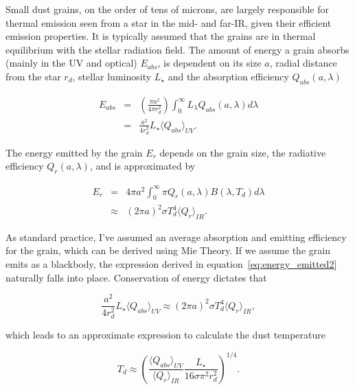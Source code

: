     Small dust grains, on the order of tens of microns, are largely responsible for thermal emission seen from a star in the mid- and far-IR, given their efficient emission properties. It is typically assumed that the grains are in thermal equilibrium with the stellar radiation field. The amount of energy a grain absorbs (mainly in the UV and optical) $E_{abs}$, is dependent on its size $a$, radial distance from the star $r_d$, stellar luminosity $L_\star$ and the absorption efficiency $Q_{abs}(a,\lambda)$
    
    \begin{eqnarray}\label{eq:energy_absorbed}
    E_{abs} &=& \left(\frac{\pi a^2}{4\pi r_d^2}\right) \int_0^\infty L_{\lambda} Q_{abs}(a,\lambda) d\lambda \\
            &=&  \frac{a^2}{4r_d^2}L_\star \langle Q_{abs}\rangle_{UV}. 
    \end{eqnarray}
    
    \noindent The energy emitted by the grain $E_{r}$ depends on the grain size, the radiative efficiency $Q_{r}(a,\lambda)$, and is approximated by
    
    \begin{eqnarray}
    E_{r} &=& 4\pi a^2 \int_0^\infty \pi Q_{r}(a,\lambda) B(\lambda,T_d)  d\lambda \label{eq:energy_emitted1}\\
          & \approx & \left(2\pi a\right)^2 \sigma T_d^4 \langle Q_{r}\rangle_{IR}. \label{eq:energy_emitted2}
    \end{eqnarray}
            
    
    \noindent As standard practice, I've assumed an average absorption and emitting efficiency for the grain, which can be derived using Mie Theory. If we assume the grain emits as a blackbody, the expression derived in equation~\ref{eq:energy_emitted2} naturally falls into place. Conservation of energy dictates that
            
            
    \begin{equation}\label{eq:conserve_energy} 
     \frac{a^2}{4r_d^2}L_\star \langle Q_{abs}\rangle_{UV} \approx \left(2\pi a\right)^2 \sigma T_d^4 \langle Q_{r}\rangle_{IR},
    \end{equation}
            
    \noindent which leads to an approximate expression to calculate the dust temperature
    
    \begin{equation}\label{eq:tdust_full}
    T_d \approx \left(\frac{\langle Q_{abs} \rangle_{UV}}{\langle Q_{r}\rangle_{IR}} \frac{L_\star}{16\sigma \pi^2 r_d^2}\right)^{1/4}.
    \end{equation}
        
